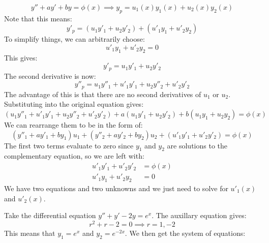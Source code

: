 \begin{itemize}
\begin{equation}
        y''+ay'+by=\phi(x) \implies y_p = u_1(x)y_1(x) + u_2(x)y_2(x)
        \label{eq:}
    \end{equation}
    Note that this means:
    \begin{equation}
        y'_p = (u_1y'_1+u_2y'_2)+(u'_1y_1+u'_2y_2)
        \label{eq:}
    \end{equation}
    To simplify things, we can arbitrarily choose:
    \begin{equation}
        u'_1y_1+u'_2y_2 = 0
        \label{eq:}
    \end{equation}
    This gives:
    \begin{equation}
        y'_p = u_1y'_1+u_2y'_2
        \label{eq:}
    \end{equation}
    The second derivative is now:
    \begin{equation}
        y''_p = u_1y''_1 + u'_1y'_1+u_2y''_2+u'_2y'_2
        \label{eq:}
    \end{equation}
    The advantage of this is that there are no second derivatives of $u_1$ or $u_2$. Substituting into the original equation gives:
    \begin{equation}
        (u_1y''_1+u'_1y'_1+u_2y''_2+u'_2y'_2) + a(u_1y'_1+u_2y'_2)+b(u_1y_1+u_2y_2)=\phi(x)
        \label{eq:}
    \end{equation}
    We can rearrange them to be in the form of:
    \begin{equation}
        (y''_1+ay'_1+by_1)u_1 + (y''_2+ay'_2+by_2)u_2 + (u'_1y'_1+u'_2y'_2) = \phi(x)
        \label{eq:}
    \end{equation}
    The first two terms evaluate to zero since $y_1$ and $y_2$ are solutions to the complementary equation, so we are left with:
    \begin{align}
        u'_1y'_1+u'_2y'_2 &= \phi(x) \\ 
        u'_1y_1+u'_2y_2 &= 0
        \label{eq:}
    \end{align}
    We have two equations and two unknowns and we just need to solve for $u'_1(x)$ and $u'_2(x)$.
    \begin{example}
        Take the differential equation $y''+y'-2y = e^x$. The auxillary equation gives:
        \begin{equation}
            r^2+r-2 = 0 \implies r=1,-2
            \label{eq:}
        \end{equation}
        This means that $y_1=e^x$ and $y_2=e^{-2x}$. We then get the system of equations:
        \begin{align}

\end{align}
\end{example}
\end{itemize}
